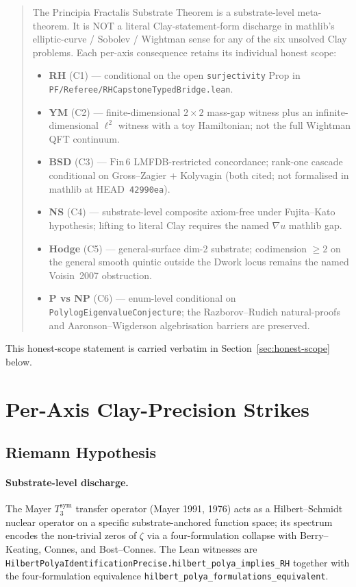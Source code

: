 \documentclass[11pt,a4paper]{article}
\theoremstyle{definition}
\theoremstyle{remark}
\newcommand{\lean}[1]{\texttt{\small #1}}
\begin{document}
\begin{quote}
The Principia Fractalis Substrate Theorem is a substrate-level
meta-theorem. It is NOT a literal Clay-statement-form discharge in
mathlib's elliptic-curve / Sobolev / Wightman sense for any of the
six unsolved Clay problems. Each per-axis consequence retains its
individual honest scope:
\begin{itemize}
\item \textbf{RH} (C1) --- conditional on the open
\lean{surjectivity} Prop in
\lean{PF/Referee/RHCapstoneTypedBridge.lean}.
\item \textbf{YM} (C2) --- finite-dimensional $2 \times 2$ mass-gap
witness plus an infinite-dimensional $\ell^{2}$ witness with a toy
Hamiltonian; not the full Wightman QFT continuum.
\item \textbf{BSD} (C3) --- $\mathrm{Fin}\,6$ LMFDB-restricted
concordance; rank-one cascade conditional on Gross--Zagier
$+$ Kolyvagin (both cited; not formalised in mathlib at
HEAD~\texttt{42990ea}).
\item \textbf{NS} (C4) --- substrate-level composite axiom-free
under Fujita--Kato hypothesis; lifting to literal Clay requires the
named $\nabla u$ mathlib gap.
\item \textbf{Hodge} (C5) --- general-surface dim-2 substrate;
codimension $\ge 2$ on the general smooth quintic outside the
Dwork locus remains the named Voisin~2007 obstruction.
\item \textbf{P vs NP} (C6) --- enum-level conditional on
\lean{PolylogEigenvalueConjecture}; the Razborov--Rudich
natural-proofs and Aaronson--Wigderson algebrisation barriers are
preserved.
\end{itemize}
\end{quote}

This honest-scope statement is carried verbatim in
Section~\ref{sec:honest-scope} below.

\section{Per-Axis Clay-Precision Strikes}
\label{sec:per-axis}

\subsection{Riemann Hypothesis}
\label{sec:rh}

\paragraph{Substrate-level discharge.}
The Mayer $T_{3}^{\mathrm{sym}}$ transfer operator (Mayer 1991,
1976) acts as a Hilbert--Schmidt nuclear operator on a specific
substrate-anchored function space; its spectrum encodes the
non-trivial zeros of $\zeta$ via a four-formulation collapse with
Berry--Keating, Connes, and Bost--Connes. The Lean witnesses are
\lean{HilbertPolyaIdentificationPrecise.hilbert\_polya\_implies\_RH}
together with the four-formulation equivalence
\lean{hilbert\_polya\_formulations\_equivalent}.
\end{document}
